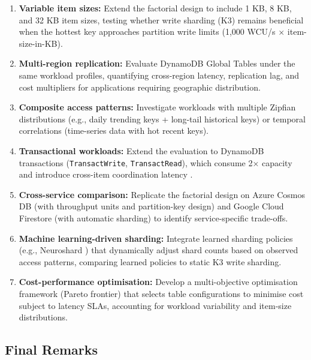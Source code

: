\begin{enumerate}
    \item \textbf{Variable item sizes:} Extend the factorial design to include 1 KB, 8 KB, and 32 KB item sizes, testing whether write sharding (K3) remains beneficial when the hottest key approaches partition write limits (1,000 WCU/s $\times$ item-size-in-KB).
    
    \item \textbf{Multi-region replication:} Evaluate DynamoDB Global Tables under the same workload profiles, quantifying cross-region latency, replication lag, and cost multipliers for applications requiring geographic distribution.
    
    \item \textbf{Composite access patterns:} Investigate workloads with multiple Zipfian distributions (e.g., daily trending keys + long-tail historical keys) or temporal correlations (time-series data with hot recent keys).
    
    \item \textbf{Transactional workloads:} Extend the evaluation to DynamoDB transactions (\texttt{TransactWrite}, \texttt{TransactRead}), which consume 2× capacity and introduce cross-item coordination latency \citep{idziorek2023transactions}.
    
    \item \textbf{Cross-service comparison:} Replicate the factorial design on Azure Cosmos DB (with throughput units and partition-key design) and Google Cloud Firestore (with automatic sharding) to identify service-specific trade-offs.
    
    \item \textbf{Machine learning-driven sharding:} Integrate learned sharding policies (e.g., Neuroshard \citep{eldeeb2022neuroshard}) that dynamically adjust shard counts based on observed access patterns, comparing learned policies to static K3 write sharding.
    
    \item \textbf{Cost-performance optimisation:} Develop a multi-objective optimisation framework (Pareto frontier) that selects table configurations to minimise cost subject to latency SLAs, accounting for workload variability and item-size distributions.
\end{enumerate}

\subsection{Final Remarks}

